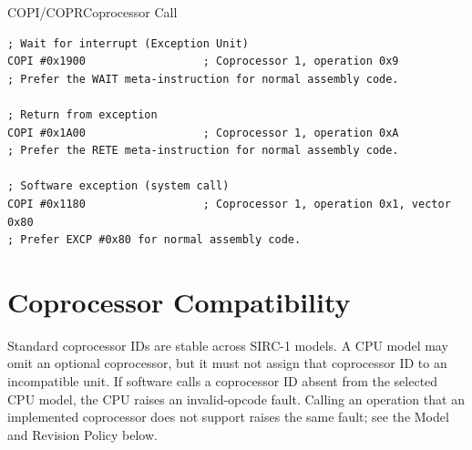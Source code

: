 \begin{instructionbox}{COPI/COPR}{Coprocessor Call}
	\begin{example}
		\begin{lstlisting}
; Wait for interrupt (Exception Unit)
COPI #0x1900                  ; Coprocessor 1, operation 0x9
; Prefer the WAIT meta-instruction for normal assembly code.

; Return from exception
COPI #0x1A00                  ; Coprocessor 1, operation 0xA
; Prefer the RETE meta-instruction for normal assembly code.

; Software exception (system call)
COPI #0x1180                  ; Coprocessor 1, operation 0x1, vector 0x80
; Prefer EXCP #0x80 for normal assembly code.
		\end{lstlisting}
		\caption{Direct Coprocessor Calls}
	\end{example}
\end{instructionbox}

\section{Coprocessor Compatibility}

Standard coprocessor IDs are stable across SIRC-1 models. A CPU model may omit an optional coprocessor, but it must not
assign that coprocessor ID to an incompatible unit. If software calls a coprocessor ID absent from the selected CPU
model, the CPU raises an invalid-opcode fault. Calling an operation that an implemented coprocessor does not support
raises the same fault; see the Model and Revision Policy below.

